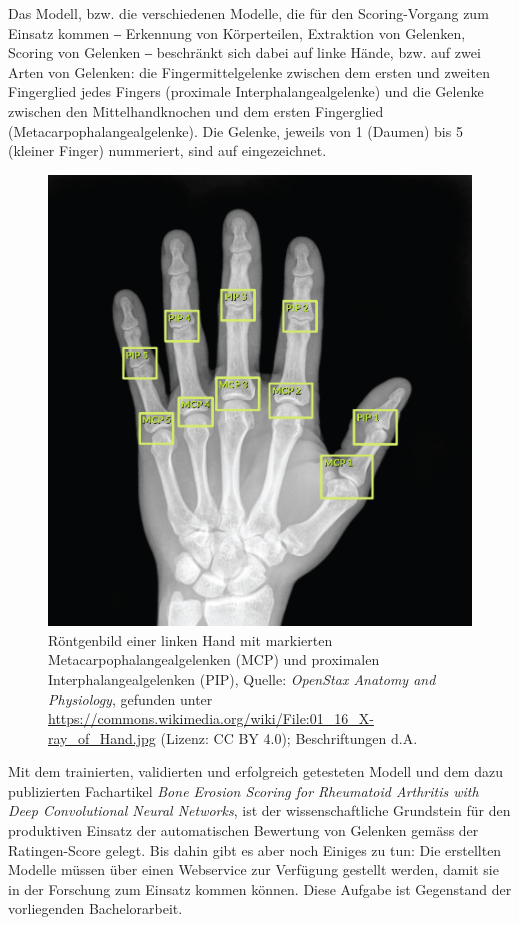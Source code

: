 Das Modell, bzw. die verschiedenen Modelle, die für den Scoring-Vorgang zum Einsatz kommen ‒ Erkennung von Körperteilen, Extraktion von Gelenken, Scoring von Gelenken ‒ beschränkt sich dabei auf linke Hände, bzw. auf zwei Arten von Gelenken: die Fingermittelgelenke zwischen dem ersten und zweiten Fingerglied jedes Fingers (proximale Interphalangealgelenke) und die Gelenke zwischen den Mittelhandknochen und dem ersten Fingerglied (Metacarpophalangealgelenke). Die Gelenke, jeweils von 1 (Daumen) bis 5 (kleiner Finger) nummeriert, sind auf  eingezeichnet.

\begin{figure}
    \centering
    \includegraphics[width=\linewidth]{pics/xray-left-hand-annotated.png}
    \caption{Röntgenbild einer linken Hand mit markierten Metacarpophalangealgelenken (MCP) und proximalen Interphalangealgelenken (PIP), Quelle: \textit{OpenStax Anatomy and Physiology}, gefunden unter \url{https://commons.wikimedia.org/wiki/File:01_16_X-ray_of_Hand.jpg} (Lizenz: CC BY 4.0); Beschriftungen d.A.}
    \label{fig:xray-left-hand-annotated}
\end{figure}

Mit dem trainierten, validierten und erfolgreich getesteten Modell und dem dazu publizierten Fachartikel \textit{Bone Erosion Scoring for Rheumatoid Arthritis with Deep Convolutional Neural Networks}, \cite{rohrbach2019} ist der wissenschaftliche Grundstein für den produktiven Einsatz der automatischen Bewertung von Gelenken gemäss der Ratingen-Score gelegt. Bis dahin gibt es aber noch Einiges zu tun: Die erstellten Modelle müssen über einen Webservice zur Verfügung gestellt werden, damit sie in der Forschung zum Einsatz kommen können. Diese Aufgabe ist Gegenstand der vorliegenden Bachelorarbeit.

